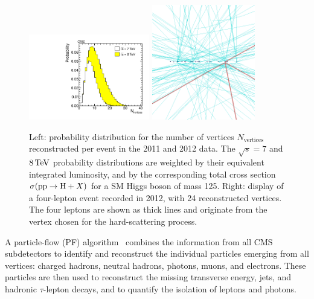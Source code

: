 \documentclass[12pt,twoside,a4paper,cmspaper,final,collab]{cms-tdr}
\begin{document}
\begin{figure}[htb]
\begin{center}
\includegraphics[width=0.47\textwidth]{figures/reconstruction/vertices.pdf}
\hspace{0.5cm}
\includegraphics[width=0.4\textwidth]{figures/reconstruction/vertex_display.png}
\end{center}
\caption{Left: probability distribution for the number of vertices $N_\text{vertices}$ reconstructed per event in the 2011 and 2012 data.
The $\sqrt{s}=7$ and $8\,\text{Te\hspace{-.08em}V}$ probability distributions are weighted by their equivalent integrated luminosity, and by the corresponding total cross section $\sigma(\mathrm{p}\mathrm{p} \to \mathrm{H}+X)$ for a SM Higgs boson of mass 125\GeV.
Right: display of a four-lepton event recorded in 2012, with 24 reconstructed vertices.
The four leptons are shown as thick lines and originate from the vertex chosen for the hard-scattering process.}
\label{fig:reconstruction_vertices}
\end{figure}

A particle-flow (PF) algorithm~\cite{CMS-PAS-PFT-09-001, CMS-PAS-PFT-10-002} combines the information
 from all CMS subdetectors to identify and reconstruct the individual particles emerging from all vertices:
charged hadrons, neutral hadrons, photons, muons, and electrons.
These particles are then used to reconstruct the missing transverse
energy,
jets, and hadronic $\tau$-lepton decays,
and to quantify the isolation of leptons and photons.
\end{document}
